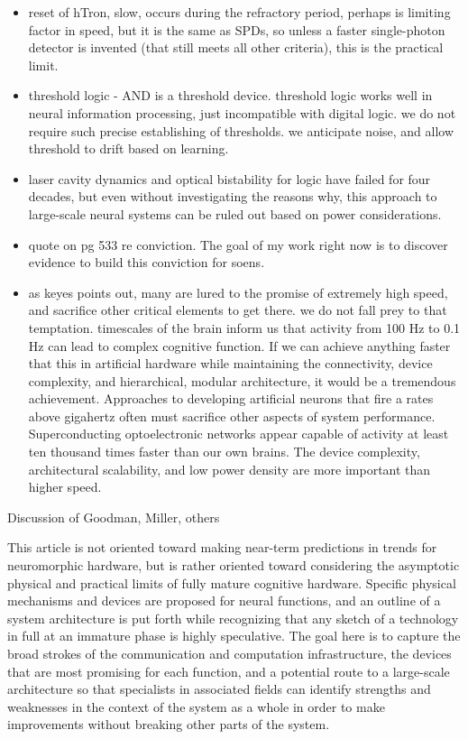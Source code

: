 \begin{itemize}
\item reset of hTron, slow, occurs during the refractory period, perhaps is limiting factor in speed, but it is the same as SPDs, so unless a faster single-photon detector is invented (that still meets all other criteria), this is the practical limit.
\item threshold logic - AND is a threshold device. threshold logic works well in neural information processing, just incompatible with digital logic. we do not require such precise establishing of thresholds. we anticipate noise, and allow threshold to drift based on learning. 
\item laser cavity dynamics and optical bistability for logic have failed for four decades, but even without investigating the reasons why, this approach to large-scale neural systems can be ruled out based on power considerations. 
\item \cite{ke1985b} quote on pg 533 re conviction. The goal of my work right now is to discover evidence to build this conviction for soens.
\item as keyes points out, many are lured to the promise of extremely high speed, and sacrifice other critical elements to get there. we do not fall prey to that temptation. timescales of the brain inform us that activity from 100 Hz to 0.1 Hz can lead to complex cognitive function. If we can achieve anything faster that this in artificial hardware while maintaining the connectivity, device complexity, and hierarchical, modular architecture, it would be a tremendous achievement. Approaches to developing artificial neurons that fire a rates above gigahertz often must sacrifice other aspects of system performance. Superconducting optoelectronic networks appear capable of activity at least ten thousand times faster than our own brains. The device complexity, architectural scalability, and low power density are more important than higher speed. 
\end{itemize}

\vspace{3em}
Discussion of Goodman, Miller, others

\vspace{3em}
This article is not oriented toward making near-term predictions in trends for neuromorphic hardware, but is rather oriented toward considering the asymptotic physical and practical limits of fully mature cognitive hardware. Specific physical mechanisms and devices are proposed for neural functions, and an outline of a system architecture is put forth while recognizing that any sketch of a technology in full at an immature phase is highly speculative. The goal here is to capture the broad strokes of the communication and computation infrastructure, the devices that are most promising for each function, and a potential route to a large-scale architecture so that specialists in associated fields can identify strengths and weaknesses in the context of the system as a whole in order to make improvements without breaking other parts of the system.

